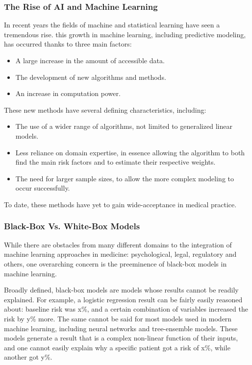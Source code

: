 \documentclass[a4paper,12pt]{article}
\begin{document}
			\subsubsection{The Rise of AI and Machine Learning}
		
			In recent years the fields of machine and statistical learning have seen a tremendous rise\cite{Obermeyer2016}. this growth in machine learning, including predictive modeling, has occurred thanks to three main factors\cite{Shalev-Shwartz2014}:
			\begin{itemize}
				\item A large increase in the amount of accessible data.
				\item The development of new algorithms and methods.
				\item An increase in computation power.
			\end{itemize} 
			These new methods have several defining characteristics, including:
			\begin{itemize}
				\item The use of a wider range of algorithms, not limited to generalized linear models.
				\item Less reliance on domain expertise, in essence allowing the algorithm to both find the main risk factors and to estimate their respective weights.
				\item The need for larger sample sizes, to allow the more complex modeling to occur successfully.
			\end{itemize}
			To date, these methods have yet to gain wide-acceptance in medical practice\cite{Obermeyer2016,Deo2015}.
			
			\subsubsection{Black-Box Vs. White-Box Models}
			While there are obstacles from many different domains to the integration of machine learning approaches in medicine: psychological, legal, regulatory and others, one overarching concern is the preeminence of black-box models in machine learning\cite{Price2015}.
			
			Broadly defined, black-box models are models whose results cannot be readily explained. For example, a logistic regression result can be fairly easily reasoned about: baseline risk was x\%, and a certain combination of variables increased the risk by y\% more. The same cannot be said for most models used in modern machine learning, including neural networks and tree-ensemble models. These models generate a result that is a complex non-linear function of their inputs, and one cannot easily explain why a specific patient got a risk of x\%, while another got y\%.
			
\end{document}
